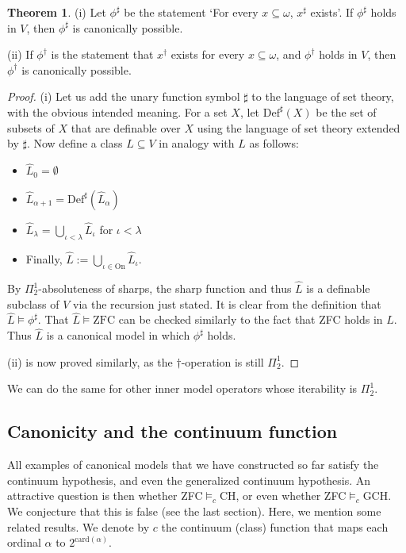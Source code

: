 \documentclass[a4paper,12pt]{amsart}
\theoremstyle{definition}
\newtheorem{thm}[fact]{Theorem}
\begin{document}
\begin{thm}{\label{sharp closure}}
(i) Let $\phi^{\sharp}$ be the statement `For every $x\subseteq\omega$, $x^{\sharp}$ exists'.
If $\phi^{\sharp}$ holds in $V$, then $\phi^{\sharp}$ is canonically possible.

(ii) If $\phi^{\dagger}$ is the statement that $x^{\dagger}$ exists for  every $x\subseteq\omega$,
and $\phi^{\dagger}$ holds in $V$, then $\phi^{\dagger}$ is canonically possible.
\end{thm}
\begin{proof}
(i) Let us add the unary function symbol $\sharp$ to the language of set theory, with the obvious intended meaning.
For a set $X$, let $\text{Def}^{\sharp}(X)$ be the set of
subsets of $X$ that are definable over $X$ using the language of set theory extended by $\sharp$. 
Now define a class $\hat{L}\subseteq V$ in analogy with $L$ as follows: 

\begin{itemize}
 \item $\hat{L}_{0}=\emptyset$
 \item $\hat{L}_{\alpha+1}=\text{Def}^{\sharp}(\hat{L}_{\alpha})$
 \item $\hat{L}_{\lambda}=\bigcup_{\iota<\lambda}\hat{L}_{\iota}$ for $\iota<\lambda$
 \item Finally, $\hat{L}:=\bigcup_{\iota\in\text{On}}\hat{L}_{\iota}$.
\end{itemize}

By $\Pi^{1}_{2}$-absoluteness of sharps, the sharp function and thus $\hat{L}$ is a definable subclass of $V$ via the recursion
just stated.
It is clear from the definition that $\hat{L}\models\phi^{\sharp}$. That $\hat{L}\models\text{ZFC}$ can be checked similarly
to the fact that ZFC holds in $L$. 
Thus $\hat{L}$ is a canonical model in which $\phi^{\sharp}$ holds.

(ii) is now proved similarly, as the $\dagger$-operation is still $\Pi^{1}_{2}$.
\end{proof}

We can do the same for other inner model operators whose iterability is $\Pi^1_2$. 

\subsection{Canonicity and the continuum function}

All examples of canonical models that we have constructed so far satisfy the continuum hypothesis, and even the generalized continuum hypothesis. 
An attractive question is then whether ZFC$\models_{c}$CH, or even whether ZFC$\models_{c}$GCH. 
We conjecture that this is false (see the last section). 
Here, we mention some related results. We denote by $c$ the continuum (class) function that maps each ordinal $\alpha$ to $2^{\text{card}(\alpha)}$. 
\end{document}
